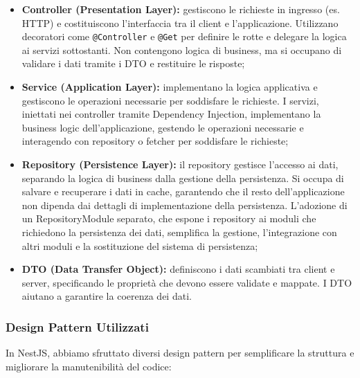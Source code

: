 \begin{itemize}  
  \item \textbf{Controller (Presentation Layer):} gestiscono le richieste in ingresso (es. HTTP) e costituiscono l'interfaccia tra il client e l'applicazione. Utilizzano decoratori come \texttt{@Controller} e \texttt{@Get} per definire le rotte e delegare la logica ai servizi sottostanti. Non contengono logica di business, ma si occupano di validare i dati tramite i DTO e restituire le risposte;
  
  \item \textbf{Service (Application Layer):} implementano la logica applicativa e gestiscono le operazioni necessarie per soddisfare le richieste. I servizi, iniettati nei controller tramite Dependency Injection, implementano la business logic dell'applicazione, gestendo le operazioni necessarie e interagendo con repository o fetcher per soddisfare le richieste;
  
  \item \textbf{Repository (Persistence Layer):} il repository gestisce l'accesso ai dati, separando la logica di business dalla gestione della persistenza. Si occupa di salvare e recuperare i dati in cache, garantendo che il resto dell'applicazione non dipenda dai dettagli di implementazione della persistenza. L'adozione di un RepositoryModule separato, che espone i repository ai moduli che richiedono la persistenza dei dati, semplifica la gestione, l'integrazione con altri moduli e la sostituzione del sistema di persistenza;
  
  \item \textbf{DTO (Data Transfer Object):} definiscono i dati scambiati tra client e server, specificando le proprietà che devono essere validate e mappate. I DTO aiutano a garantire la coerenza dei dati.
\end{itemize}

\subsubsection{Design Pattern Utilizzati}

In NestJS, abbiamo sfruttato diversi design pattern per semplificare la struttura e migliorare la manutenibilità del codice:

